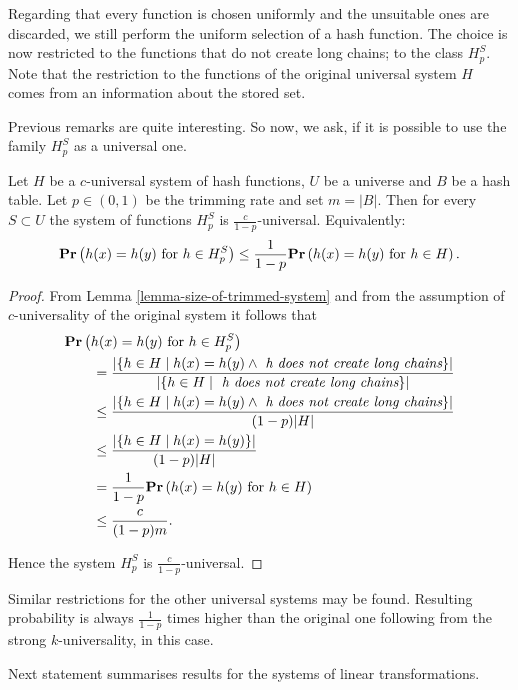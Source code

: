 Regarding that every function is chosen uniformly and the unsuitable ones are discarded, we still perform the uniform selection of a hash function. The choice is now restricted to the functions that do not create long chains; to the class $H_p^S$. Note that the restriction to the functions of the original universal system $H$ comes from an information about the stored set.

Previous remarks are quite interesting. So now, we ask, if it is possible to use the family $H_p^S$ as a universal one.
\begin{theorem}
\label{theorem-p-trimmed-is-universal}
Let $H$ be a $c$-universal system of hash functions, $U$ be a universe and $B$ be a hash table. Let $p \in (0, 1)$ be the trimming rate and set $m = |B|$. Then for every $S \subset U$ the system of functions $H_p^S$ is $\frac{c}{1 - p}$-universal. Equivalently:
\[
	\mathbf{Pr}\left(h(x) = h(y) \text{ for } h \in H_p^S\right) \leq \frac{1}{1 - p} \mathbf{Pr}\left(h(x) = h(y) \text{ for } h \in H\right) \text{.}
\]
\end{theorem}
\begin{proof}
From Lemma \ref{lemma-size-of-trimmed-system} and from the assumption of $c$-universality of the original system it follows that 
\[
\begin{split}
& \mathbf{Pr}\left(h(x) = h(y) \text{ for } h \in H_p^S\right)  \\
	& \qquad =  \frac{|\{ h \in H \mid h(x) = h(y) \wedge \textit{ h does not create long chains} \}|}{|\lbrace h \in H \mid \textit{ h does not create long chains} \rbrace|} \\
	& \qquad \leq \frac{|\{ h \in H \mid h(x) = h(y) \wedge \textit{ h does not create long chains} \}|}{(1 - p)|H|} \\ 
	& \qquad \leq \frac{|\{ h \in H \mid h(x) = h(y) \}|}{(1 - p)|H|} \\
	& \qquad = \frac{1}{1 - p} \mathbf{Pr}\left(h(x) = h(y) \text{ for } h \in H\right) \\
	& \qquad \leq \frac{c}{(1 - p) m} \text{.}
\end{split}
\]

Hence the system $H_p^S$ is $\frac{c}{1 - p}$-universal.
\end{proof}

Similar restrictions for the other universal systems may be found. Resulting probability is always $\frac{1}{1 - p}$ times higher than the original one following from the strong $k$-universality, in this case.

Next statement summarises results for the systems of linear transformations.

